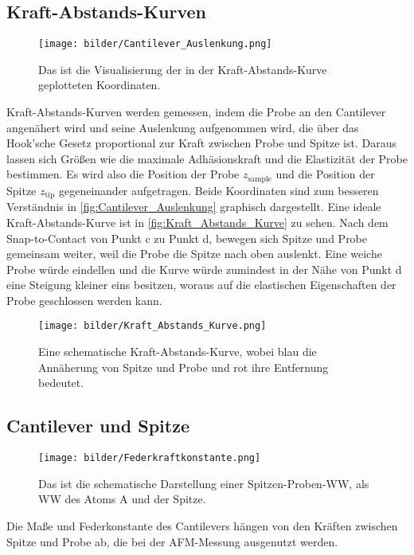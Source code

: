 \subsection{Kraft-Abstands-Kurven}
    \begin{figure}[ht]
        \centering\captionsetup{format=plain}
        \texttt{[image: bilder/Cantilever\_Auslenkung.png]}
        \caption{Das ist die Visualisierung der in der Kraft-Abstands-Kurve geplotteten Koordinaten. \cite{voigtlaender}}
        \label{fig:Cantilever_Auslenkung}
    \end{figure}
    \FloatBarrier
    Kraft-Abstands-Kurven werden gemessen, indem die Probe an den Cantilever angenähert wird und seine Auslenkung aufgenommen wird, die über das Hook'sche Gesetz proportional zur Kraft zwischen Probe und Spitze ist.
    Daraus lassen sich Größen wie die maximale Adhäsionskraft und die Elastizität der Probe bestimmen.
    Es wird also die Position der Probe $z_{\mathrm{sample}}$ und die Position der Spitze $z_{\mathrm{tip}}$ gegeneinander aufgetragen.
    Beide Koordinaten sind zum besseren Verständnis in \autoref{fig:Cantilever_Auslenkung} graphisch dargestellt.
    Eine ideale Kraft-Abstands-Kurve ist in \autoref{fig:Kraft_Abstands_Kurve} zu sehen.
    Nach dem Snap-to-Contact von Punkt c zu Punkt d, bewegen sich Spitze und Probe gemeinsam weiter, weil die Probe die Spitze nach oben auslenkt.
    Eine weiche Probe würde eindellen und die Kurve würde zumindest in der Nähe von Punkt d eine Steigung kleiner eins besitzen, woraus auf die elastischen Eigenschaften der Probe geschlossen werden kann.
    \begin{figure}[ht]
        \centering\captionsetup{format=plain}
        \texttt{[image: bilder/Kraft\_Abstands\_Kurve.png]}
        \caption{Eine schematische Kraft-Abstands-Kurve, wobei blau die Annäherung von Spitze und Probe und rot ihre Entfernung bedeutet. \cite{voigtlaender}}
        \label{fig:Kraft_Abstands_Kurve}
    \end{figure}
    \FloatBarrier

\subsection{Cantilever und Spitze}
\label{sec:cantilever}
    \setlength{\columnsep}{25pt}
    \begin{wrapfigure}{r}{0.4\textwidth} \vspace*{-0.5cm}
        \centering{}
        \texttt{[image: bilder/Federkraftkonstante.png]}
        \caption{Das ist die schematische Darstellung einer Spitzen-Proben-WW, als WW des Atoms A und der Spitze. \cite{atomic_force_microscope}} \vspace*{-0.3cm}
        \label{fig:Federkraftkonstante}
    \end{wrapfigure} 
    \FloatBarrier
    Die Maße und Federkonstante des Cantilevers hängen von den Kräften zwischen Spitze und Probe ab, die bei der AFM-Messung ausgenutzt werden.
    
